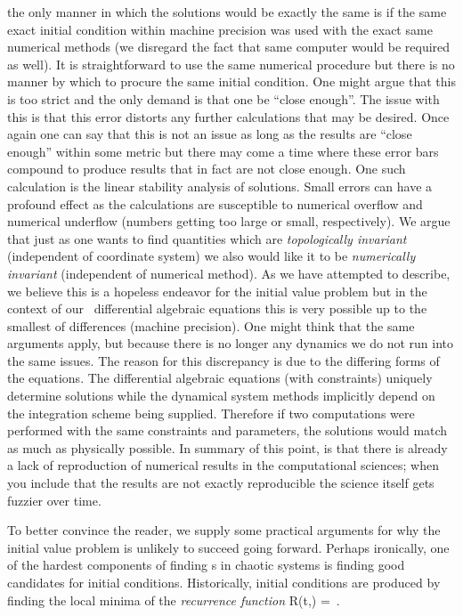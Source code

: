 the only manner in which the solutions would be exactly the same
is if the same exact initial condition within machine
precision was used with the exact same
numerical methods (we disregard the fact that
same computer would be required as well).
It is straightforward to use the same numerical procedure but
there is no manner by which to procure the same initial condition.
One might argue that this is too strict and the only demand
is that one be ``close enough''. The issue with this
is that this error distorts any further calculations that
may be desired. Once again
one can say that this is not an issue as long as the results are
``close enough'' within some metric but there may come a time
where these error bars compound to produce results that in fact
are not close enough. One such calculation is the linear stability
analysis of solutions. Small errors can have a profound effect
as the calculations are susceptible to numerical overflow and
numerical underflow (numbers getting too large or small, respectively).
We argue that just as one wants to find
quantities which are \textit{topologically invariant} (independent
of coordinate system) we also would
like it to be \textit{numerically invariant}
(independent of numerical method). As we have attempted
to describe, we believe this is a hopeless endeavor
for the initial value problem
but in the context of our \spt\ differential algebraic equations
this is very possible up to the smallest of differences
(machine precision). One might think that the same arguments
apply, but because there is no longer any dynamics we do not
run into the same issues. The reason for this discrepancy is
due to the differing forms of the equations. The differential
algebraic equations (with constraints) uniquely determine solutions
while the dynamical system methods implicitly depend on
the integration scheme being supplied. Therefore if two
computations were performed with the same constraints and
parameters, the solutions would match as much as physically
possible.
In summary of this point, is that there
is already a lack of reproduction of numerical results
in the computational sciences; when you include that the
results are not exactly reproducible the science itself gets
fuzzier over time.

To better convince the reader, we supply some practical
arguments for why the initial value problem is unlikely to
succeed going forward. Perhaps ironically, one of the hardest
components of finding {\po}s in chaotic systems is finding
good candidates for initial conditions.
Historically, initial conditions
are produced by finding the local minima of the \emph{recurrence
function}
\beq
R(t,\period{}) = 
\,.

